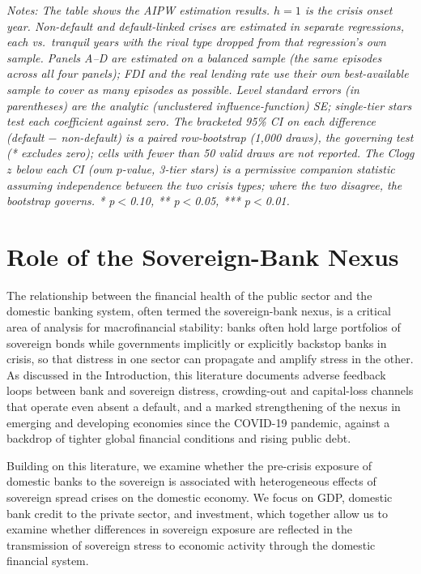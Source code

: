 \documentclass[12pt]{article}
\newcommand{\notes}[1]{\par\begingroup\footnotesize\itshape\justifying\noindent Notes: #1\par\endgroup}
\begin{document}
\endgroup
\notes{The table shows the AIPW estimation results. $h=1$ is the crisis
onset year. Non-default and default-linked crises are estimated in
separate regressions, each vs.\ tranquil years with the rival type
dropped from that regression's own sample. Panels A--D are estimated on
a balanced sample (the same episodes across all four panels); FDI and
the real lending rate use their own best-available sample to cover as
many episodes as possible. Level standard errors (in parentheses) are
the analytic (unclustered influence-function) SE; single-tier stars
test each coefficient against zero. The bracketed 95\% CI on each
difference (default $-$ non-default) is a paired row-bootstrap (1,000
draws), the governing test (* excludes zero); cells with fewer than 50
valid draws are not reported. The Clogg $z$ below each CI (own
$p$-value, 3-tier stars) is a permissive companion statistic assuming
independence between the two crisis types; where the two disagree, the
bootstrap governs. * p$<$0.10, ** p$<$0.05, *** p$<$0.01.}


\section{Role of the Sovereign-Bank Nexus}
\label{sec:nexus}

The relationship between the financial health of the public sector and
the domestic banking system, often termed the sovereign-bank nexus, is a
critical area of analysis for macrofinancial stability: banks often hold
large portfolios of sovereign bonds while governments implicitly or
explicitly backstop banks in crisis, so that distress in one sector can
propagate and amplify stress in the other. As discussed in the
Introduction, this literature documents adverse feedback loops between
bank and sovereign distress, crowding-out and capital-loss channels that
operate even absent a default, and a marked strengthening of the nexus in
emerging and developing economies since the COVID-19 pandemic, against a
backdrop of tighter global financial conditions and rising public debt.

Building on this literature, we examine whether the pre-crisis exposure
of domestic banks to the sovereign is associated with heterogeneous
effects of sovereign spread crises on the domestic economy. We focus on
GDP, domestic bank credit to the private sector, and investment, which
together allow us to examine whether differences in sovereign exposure
are reflected in the transmission of sovereign stress to economic
activity through the domestic financial system.
\end{document}
